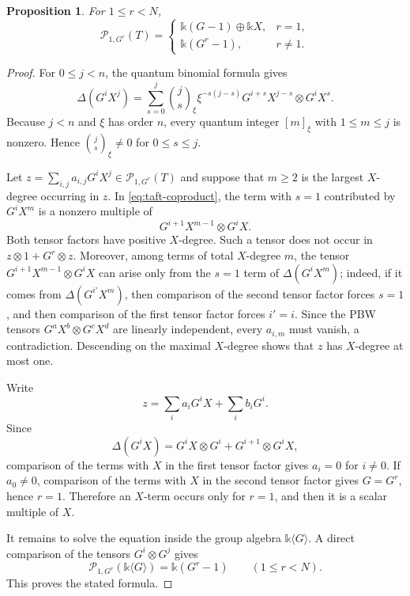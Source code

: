 \documentclass[twoside,11pt]{amsart}
\newtheorem{pro}[defi]{Proposition}
\newcommand{\K}{\mathds{k}}
\newcommand{\Pp}{\mathcal{P}}
\begin{document}
	\begin{pro}\label{prop:primitive-T}
		For $1\le r<N$,
		\[
		\Pp_{1,G^r}(T)=
		\begin{cases}
			\K(G-1)\oplus\K X,&r=1,\\
			\K(G^r-1),&r\ne1.
		\end{cases}
		\]
	\end{pro}
	\begin{proof}
		For $0\le j<n$, the quantum binomial formula gives
		\begin{equation}\label{eq:taft-coproduct}
			\Delta(G^iX^j)
			=\sum_{s=0}^j
			\binom{j}{s}_{\xi}\xi^{-s(j-s)}
			G^{i+s}X^{j-s}\otimes G^iX^s.
		\end{equation}
		Because $j<n$ and $\xi$ has order $n$, every quantum integer
		$[m]_{\xi}$ with $1\le m\le j$ is nonzero. Hence
		$\binom{j}{s}_{\xi}\ne0$ for $0\le s\le j$.
		
		Let
		$z=\sum_{i,j}a_{i,j}G^iX^j\in\Pp_{1,G^r}(T)$ and suppose that $m\ge2$ is the
		largest $X$-degree occurring in $z$. In \eqref{eq:taft-coproduct}, the term
		with $s=1$ contributed by $G^iX^m$ is a nonzero multiple of
		\[
		G^{i+1}X^{m-1}\otimes G^iX.
		\]
		Both tensor factors have positive $X$-degree. Such a tensor does not occur in
		$z\otimes1+G^r\otimes z$. Moreover, among terms of total $X$-degree $m$, the tensor
		$G^{i+1}X^{m-1}\otimes G^iX$ can arise only from the $s=1$ term of
		$\Delta(G^iX^m)$; indeed, if it comes from $\Delta(G^{i'}X^m)$,
		then comparison of the second tensor factor forces $s=1$, and then
		comparison of the first tensor factor forces $i'=i$. Since the PBW tensors
		$G^aX^b\otimes G^cX^d$ are linearly independent, every $a_{i,m}$ must
		vanish, a contradiction. Descending on the maximal $X$-degree shows that
		$z$ has $X$-degree at most one.
		
		Write
		\[
		z=\sum_i a_iG^iX+\sum_i b_iG^i.
		\]
		Since
		\[
		\Delta(G^iX)=G^iX\otimes G^i+G^{i+1}\otimes G^iX,
		\]
		comparison of the terms with $X$ in the first tensor factor gives $a_i=0$
		for $i\ne0$. If $a_0\ne0$, comparison of the terms with $X$ in the second
		tensor factor gives $G=G^r$, hence $r=1$. Therefore an $X$-term occurs only
		for $r=1$, and then it is a scalar multiple of $X$.
		
		It remains to solve the equation inside the group algebra $\K\langle G\rangle$.
		A direct comparison of the tensors $G^i\otimes G^j$ gives
		\[
		\Pp_{1,G^r}(\K\langle G\rangle)=\K(G^r-1)
		\qquad (1\le r<N).
		\]
		This proves the stated formula.
	\end{proof}
	
\end{document}
